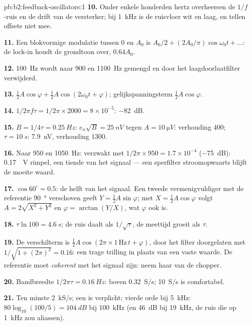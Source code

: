 \begin{solution}{pb:b2:feedback-oscillators:1}
\textbf{10.} Onder enkele honderden hertz overheersen de $1/f$-ruis en de
drift van de versterker; bij \qty{1}{kHz} is de ruisvloer wit en laag, en
tellen offsets niet mee.

\textbf{11.} Een blokvormige modulatie tussen $0$ en $A_0$ is
$A_0/2 + (2A_0/\pi)
\cos\omega_0t + \dots$: de lock-in houdt de grondtoon
over, $0.64A_0$.

\textbf{12.} \qty{100}{Hz} wordt naar $900$ en \qty{1100}{Hz} gemengd en
door het laagdoorlaatfilter verwijderd.

\textbf{13.} $\tfrac12A\cos\varphi + \tfrac12A\cos(2\omega_0t + \varphi)$;
gelijkspanningsterm $\tfrac12A\cos\varphi$.

\textbf{14.} $1/2\pi f\tau = 1/2\pi \times 2000 = 8 \times 10^{-5}$: \qty{-82}{dB}.

\textbf{15.} $B = 1/4\tau = \qty{0.25}{Hz}$: $e_n\sqrt B = \qty{25}{nV}$
tegen $A =
\qty{10}{\micro V}$: verhouding $400$; $\tau = \qty{10}{s}$:
\qty{7.9}{nV}, verhouding $1300$.

\textbf{16.} Naar $950$ en \qty{1050}{Hz}: verzwakt met
$1/2\pi \times 950 = 1.7 \times
10^{-4}$ (\qty{-75}{dB}): \qty{0.17}{\micro
V} rimpel, een tiende van het signaal --- een sperfilter stroomopwaarts
blijft de moeite waard.

\textbf{17.} $\cos60^\circ = 0.5$: de helft van het signaal. Een tweede
vermenigvuldiger met de referentie \qty{90}{\degree} verschoven geeft
$Y = \tfrac12A\sin\varphi$; met $X =
\tfrac12A\cos\varphi$ volgt
$A = 2\sqrt{X^2 + Y^2}$ en $\varphi = \arctan(Y/X)$, wat $\varphi$ ook is.

\textbf{18.} $\tau\ln100 = \qty{4.6}{s}$; de ruis daalt als $1/\sqrt\tau$,
de meettijd groeit als $\tau$.

\textbf{19.} De verschilterm is
$\tfrac12A\cos(2\pi \times 1\,\text{Hz}\,t + \varphi)$, door het filter
doorgelaten met $1/\sqrt{1 + (2\pi)^2} = 0.16$: een trage trilling in plaats
van een vaste waarde. De referentie moet \emph{coherent} met het signaal
zijn: neem haar van de chopper.

\textbf{20.} Bandbreedte $1/2\pi\tau = \qty{0.16}{Hz}$: boven
\qty{0.32}{S/s}; \qty{10}{S/s} is comfortabel.

\textbf{21.} Ten minste \qty{2}{kS/s}; een  is verplicht;
vierde orde bij \qty{5}{kHz}: $80\log_{10}(100/5) = \qty{104}{dB}$ bij
\qty{100}{kHz} (en \qty{46}{dB} bij \qty{19}{kHz}, de ruis die op
\qty{1}{kHz} zou aliassen).


\end{solution}
